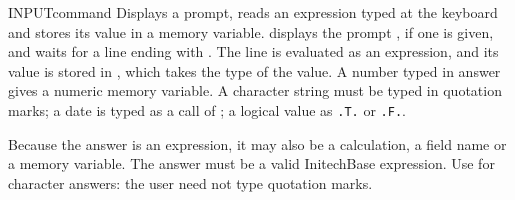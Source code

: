 \begin{XbaseEntry}{INPUT}{command}
Displays a prompt, reads an expression typed at the keyboard and stores its
value in a memory variable.
\Syntax
{}
\Usage
{} displays the prompt , if one is given, and waits for a
line ending with .  The line is evaluated as an expression, and its
value is stored in , which takes the type of the value.  A number
typed in answer gives a numeric memory variable.  A character string must be
typed in quotation marks; a date is typed as a call of ; a logical
value as \texttt{.T.} or \texttt{.F.}.

Because the answer is an expression, it may also be a calculation, a field
name or a memory variable.  The answer must be a valid InitechBase
expression.
\Tips
Use  for character answers: the user need not type quotation
marks.
\Examples
{}
\end{XbaseEntry}

